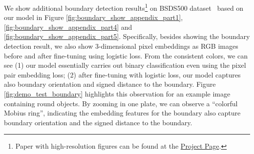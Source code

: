 \documentclass[10pt,twocolumn,letterpaper]{article}
\begin{document}
We show additional boundary detection results\footnote{Paper with high-resolution figures can be found at the
\href{http://www.ics.uci.edu/~skong2/SMMMSG.html}{Project Page}.} on BSDS500
dataset~\cite{arbelaez2011contour} based on our model in Figure
\ref{fig:boundary_show_appendix_part1},
\ref{fig:boundary_show_appendix_part4}
and \ref{fig:boundary_show_appendix_part5}.
Specifically, besides showing the boundary detection result, we also show
3-dimensional pixel embeddings as RGB images before and after fine-tuning using
logistic loss.  From the consistent colors, we can see (1) our model
essentially carries out binary classification even using the pixel pair
embedding loss; (2) after fine-tuning with logistic loss, our model captures
also boundary orientation and signed distance to the boundary.  Figure
\ref{fig:demo_test_boundary} highlights this observation for an example image
containing round objects.  By zooming in one plate, we can observe a ``colorful
Mobius ring'', indicating the embedding features for the boundary also capture
boundary orientation and the signed distance to the boundary.
\end{document}
